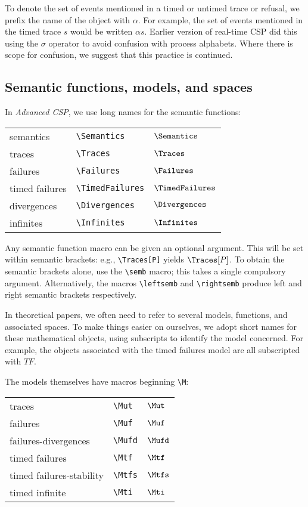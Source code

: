 \documentclass[12pt]{article}
\begin{document}
To denote the set of events mentioned in a timed or untimed trace or
refusal, we prefix the name of the object with $\alpha$.  For example,
the set of events mentioned in the timed trace $s$ would be written
$\alpha s$.  Earlier version of real-time CSP did this using the
$\sigma$ operator to avoid confusion with process alphabets.  Where
there is scope for confusion, we suggest that this practice is
continued.

\subsection{Semantic functions, models, and spaces}

In {\sl  Advanced CSP}, we use long names for the semantic functions:

\begin{tabular}{p{1.95in}p{1.75in}l} \\
semantics       & \verb|\Semantics|     & $\Semantics$ \\
traces          & \verb|\Traces|        & $\Traces$ \\
failures        & \verb|\Failures|      & $\Failures$ \\
timed failures  & \verb|\TimedFailures| & $\TimedFailures$ \\
divergences     & \verb|\Divergences|   & $\Divergences$ \\
infinites       & \verb|\Infinites|     & $\Infinites$
\end{tabular} 

Any semantic function macro can be given an optional argument. This
will be set within semantic brackets: e.g., \verb|\Traces[P]| yields
$\Traces[P]$.  To obtain the semantic brackets alone, use the
\verb|\semb| macro; this takes a single compulsory argument.
Alternatively, the macros \verb|\leftsemb| and \verb|\rightsemb|
produce left and right semantic brackets respectively.

In theoretical papers, we often need to refer to several models,
functions, and associated spaces.  To make things easier on ourselves,
we adopt short names for these mathematical objects, using subscripts
to identify the model concerned.  For example, the objects associated
with the timed failures model are all subscripted with $TF$.

The models themselves have macros beginning \verb|\M|:

\begin{tabular}{p{2.4in}p{1.1in}l} \\
traces                          & \verb|\Mut|   & $ \Mut  $     \\
failures                        & \verb|\Muf|   & $ \Muf  $     \\
failures-divergences            & \verb|\Mufd|  & $ \Mufd $     \\
timed failures                  & \verb|\Mtf|   & $ \Mtf  $     \\
timed failures-stability        & \verb|\Mtfs|  & $ \Mtfs $     \\
timed infinite                  & \verb|\Mti|   & $ \Mti  $
\end{tabular} 
\end{document}
